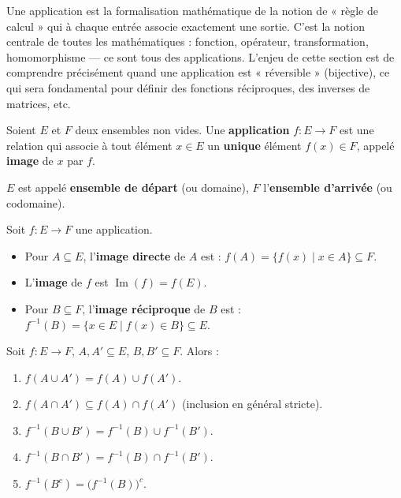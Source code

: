 \documentclass[11pt,a4paper,twoside]{book}
\DeclareMathOperator{\Im}{Im}
\begin{document}
Une application est la formalisation mathématique de la notion de « règle de calcul » qui à chaque entrée associe exactement une sortie. C'est la notion centrale de toutes les mathématiques : fonction, opérateur, transformation, homomorphisme — ce sont tous des applications. L'enjeu de cette section est de comprendre précisément quand une application est « réversible » (bijective), ce qui sera fondamental pour définir des fonctions réciproques, des inverses de matrices, etc.

\begin{definitionbox}[Application]
Soient $E$ et $F$ deux ensembles non vides. Une \textbf{application} $f : E \to F$ est une
relation qui associe à tout élément $x \in E$ un \textbf{unique} élément $f(x) \in F$,
appelé \textbf{image} de $x$ par $f$.

$E$ est appelé \textbf{ensemble de départ} (ou domaine), $F$ l'\textbf{ensemble d'arrivée}
(ou codomaine).
\end{definitionbox}

\begin{definitionbox}
Soit $f : E \to F$ une application.
\begin{itemize}
  \item Pour $A \subseteq E$, l'\textbf{image directe} de $A$ est :
        $f(A) = \{f(x) \mid x \in A\} \subseteq F$.
  \item L'\textbf{image} de $f$ est $\Im(f) = f(E)$.
  \item Pour $B \subseteq F$, l'\textbf{image réciproque} de $B$ est :
        $f^{-1}(B) = \{x \in E \mid f(x) \in B\} \subseteq E$.
\end{itemize}
\end{definitionbox}

\begin{propositionbox}
Soit $f : E \to F$, $A, A' \subseteq E$, $B, B' \subseteq F$. Alors :
\begin{enumerate}
  \item $f(A \cup A') = f(A) \cup f(A')$.
  \item $f(A \cap A') \subseteq f(A) \cap f(A')$ \quad (inclusion en général stricte).
  \item $f^{-1}(B \cup B') = f^{-1}(B) \cup f^{-1}(B')$.
  \item $f^{-1}(B \cap B') = f^{-1}(B) \cap f^{-1}(B')$.
  \item $f^{-1}(B^c) = \bigl(f^{-1}(B)\bigr)^c$.
\end{enumerate}
\end{propositionbox}
\end{document}
